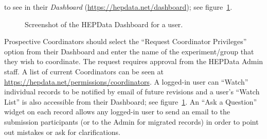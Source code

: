 \documentclass[a4paper]{jpconf}
\begin{document}
to see in their \emph{Dashboard} (\url{https://hepdata.net/dashboard}); see
figure~\ref{fig:dashboard}.
%
\begin{figure}
  \begin{center}
  \end{center}
  \caption{\label{fig:dashboard}Screenshot of the HEPData Dashboard for a user.}
\end{figure}
%
Prospective Coordinators should select the ``Request Coordinator Privileges''
option from their Dashboard and enter the name of the experiment/group that
they wish to coordinate.  The request requires approval from the HEPData Admin
staff.  A list of current Coordinators can be seen at
\url{https://hepdata.net/permissions/coordinators}.  A logged-in user can
``Watch'' individual records to be notified by email of future revisions and a
user's ``Watch List'' is also accessible from their Dashboard; see
figure~\ref{fig:dashboard}.  An ``Ask a Question'' widget on each record allows
any logged-in user to send an email to the submission participants (or to the
Admin for migrated records) in order to point out mistakes or ask for
clarifications.
\end{document}
